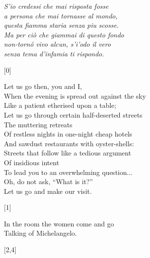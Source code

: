\documentclass{article}
\begin{document}
\begin{flushright}
\begin{minipage}{6cm}
    \emph{S'io credessi che mai risposta fosse\\
    a persona che mai tornasse al mondo,\\
    questa fiamma staria senza piu scosse.\\ %
    Ma per ci\`o che giammai di questo fondo\\
    non-torn\'o vivo alcun, s'i'odo il vero\\
    senza tema d'infamia ti rispondo.
    }
    \begin{center}[0]\end{center}
\end{minipage}
\end{flushright}

\begin{flushright}
\begin{turn}{-90}
\begin{minipage}{8cm}
    Let us go then, you and I,\\
    When the evening is spread out against the sky\\
    Like a patient etherised upon a table;\\
    Let us go through certain half-deserted streets\\
    The muttering retreats\\
    Of restless nights in one-night cheap hotels\\
    And sawdust restaurants with oyster-shells:\\
    Streets that follow like a tedious argument\\
    Of insidious intent\\
    To lead you to an overwhelming question...\\
    Oh, do not ask, ``What is it?''\\
    Let us go and make our visit.\\
    \begin{center}[1]\end{center}
\end{minipage}
\end{turn}
\end{flushright}

\begin{minipage}{7cm}
    \begin{center}
    In the room the women come and go\\
    Talking of Michelangelo.
    \begin{center}[2,4]\end{center}
    \end{center}
\end{minipage}
\end{document}
